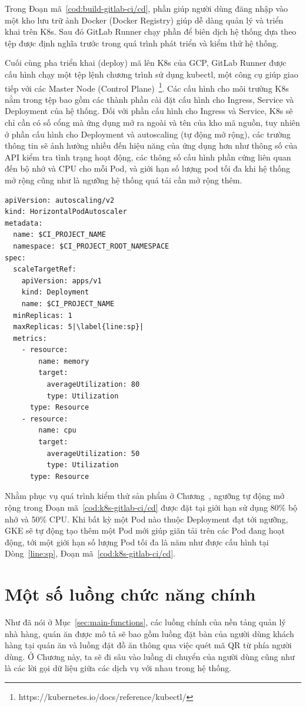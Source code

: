 Trong Đoạn mã~\ref{cod:build-gitlab-ci/cd}, phần  giúp người dùng đăng nhập vào một kho lưu trữ ảnh Docker (Docker Registry) giúp dễ dàng quản lý và triển khai trên K8s.
Sau đó GitLab Runner chạy phần  để biên dịch hệ thống dựa theo tệp  được định nghĩa trước trong quá trình phát triển và kiểm thử hệ thống.

Cuối cùng pha triển khai (deploy) mã lên K8s của GCP, GitLab Runner được cấu hình chạy một tệp lệnh chương trình sử dụng kubectl, một công cụ giúp giao tiếp với các Master Node (Control Plane)~\footnote{https://kubernetes.io/docs/reference/kubectl/}.
Các cấu hình cho môi trường K8s nằm trong tệp  bao gồm các thành phần cài đặt cấu hình cho Ingress, Service và Deployment của hệ thống.
Đối với phần cấu hình cho Ingress và Service, K8s sẽ chỉ cần có số cổng mà ứng dụng mở ra ngoài và tên của kho mã nguồn, tuy nhiên ở phần cấu hình cho Deployment và autoscaling (tự động mở rộng), các trường thông tin sẽ ảnh hưởng nhiều đến hiệu năng của ứng dụng hơn như thông số của API kiểm tra tình trạng hoạt động, các thông số cấu hình phần cứng liên quan đến bộ nhớ và CPU cho mỗi Pod, và giới hạn số lượng pod tối đa khi hệ thống mở rộng cũng như là ngưỡng hệ thống quá tải cần mở rộng thêm.
\begin{lstlisting}[style=yaml, caption={Đoạn mã cấu hình cài đặt tự động mở rộng Kubernetes cho GitLab Runner.}, label={cod:k8s-gitlab-ci/cd},  captionpos=b, escapechar=|]
apiVersion: autoscaling/v2
kind: HorizontalPodAutoscaler
metadata:
  name: $CI_PROJECT_NAME
  namespace: $CI_PROJECT_ROOT_NAMESPACE
spec:
  scaleTargetRef:
    apiVersion: apps/v1
    kind: Deployment
    name: $CI_PROJECT_NAME
  minReplicas: 1
  maxReplicas: 5|\label{line:sp}|
  metrics:
    - resource:
        name: memory
        target:
          averageUtilization: 80
          type: Utilization
      type: Resource
    - resource:
        name: cpu
        target:
          averageUtilization: 50
          type: Utilization
      type: Resource
\end{lstlisting}
Nhằm phục vụ quá trình kiểm thử sản phẩm ở Chương~, ngưỡng tự động mở rộng trong Đoạn mã~\ref{cod:k8s-gitlab-ci/cd} được đặt tại giới hạn sử dụng 80\% bộ nhớ và 50\% CPU.
Khi bất kỳ một Pod nào thuộc Deployment đạt tới ngưỡng, GKE sẽ tự động tạo thêm một Pod mới giúp giãn tải trên các Pod đang hoạt động, tới một giới hạn số lượng Pod tối đa là năm như được cấu hình tại Dòng~\ref{line:sp}, Đoạn mã~\ref{cod:k8s-gitlab-ci/cd}.
\section{Một số luồng chức năng chính}\label{sec:user-flow-examples}
Như đã nói ở Mục~\ref{sec:main-functions}, các luồng chính của nền tảng quản lý nhà hàng, quán ăn được mô tả sẽ bao gồm luồng đặt bàn của người dùng khách hàng tại quán ăn và luồng đặt đồ ăn thông qua việc quét mã QR từ phía người dùng.
Ở Chương này, ta sẽ đi sâu vào luồng di chuyển của người dùng cũng như là các lời gọi dữ liệu giữa các dịch vụ với nhau trong hệ thống.
